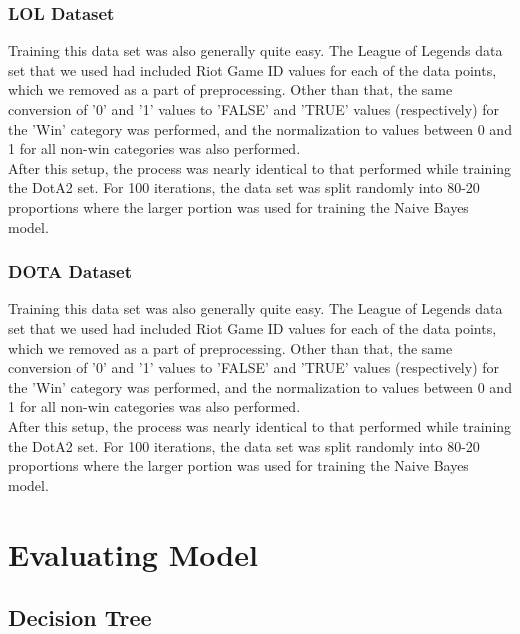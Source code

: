 \documentclass[a4paper,fleqn]{cas-sc}
\begin{document}
\subsubsection{LOL Dataset}
 Training this data set was also generally quite easy. The League of Legends data set that we used had included Riot Game ID values for each of the data points, which we removed as a part of preprocessing. Other than that, the same conversion of '0' and '1' values to 'FALSE' and 'TRUE' values (respectively) for the 'Win' category was performed, and the normalization to values between 0 and 1 for all non-win categories was also performed.\\
After this setup, the process was nearly identical to that performed while training the DotA2 set. For 100 iterations, the data set was split randomly into 80-20 proportions where the larger portion was used for training the Naive Bayes model.\\
\subsubsection{DOTA Dataset}
 Training this data set was also generally quite easy. The League of Legends data set that we used had included Riot Game ID values for each of the data points, which we removed as a part of preprocessing. Other than that, the same conversion of '0' and '1' values to 'FALSE' and 'TRUE' values (respectively) for the 'Win' category was performed, and the normalization to values between 0 and 1 for all non-win categories was also performed.\\
After this setup, the process was nearly identical to that performed while training the DotA2 set. For 100 iterations, the data set was split randomly into 80-20 proportions where the larger portion was used for training the Naive Bayes model.\\

\section{Evaluating Model}

\subsection{Decision Tree}
 
 
\end{document}
